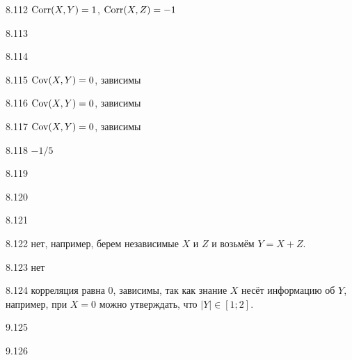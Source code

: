 \begin{solution}{{8.112}}
$\operatorname{Corr}(X,Y)=1$, $\operatorname{Corr}(X,Z)=-1$
\end{solution}
\protect \hypertarget {soln:8.113}{}
\begin{solution}{{8.113}}
\end{solution}
\protect \hypertarget {soln:8.114}{}
\begin{solution}{{8.114}}
\end{solution}
\protect \hypertarget {soln:8.115}{}
\begin{solution}{{8.115}}
      $\operatorname{Cov}(X,Y)=0$, зависимы
\end{solution}
\protect \hypertarget {soln:8.116}{}
\begin{solution}{{8.116}}
    $\operatorname{Cov}(X,Y)=0$, зависимы
\end{solution}
\protect \hypertarget {soln:8.117}{}
\begin{solution}{{8.117}}
  $\operatorname{Cov}(X,Y)=0$, зависимы
\end{solution}
\protect \hypertarget {soln:8.118}{}
\begin{solution}{{8.118}}
  $-1/5$
\end{solution}
\protect \hypertarget {soln:8.119}{}
\begin{solution}{{8.119}}
\end{solution}
\protect \hypertarget {soln:8.120}{}
\begin{solution}{{8.120}}
\end{solution}
\protect \hypertarget {soln:8.121}{}
\begin{solution}{{8.121}}
\end{solution}
\protect \hypertarget {soln:8.122}{}
\begin{solution}{{8.122}}
  нет, например, берем независимые $X$ и $Z$ и возьмём $Y=X+Z$.
\end{solution}
\protect \hypertarget {soln:8.123}{}
\begin{solution}{{8.123}}
нет
\end{solution}
\protect \hypertarget {soln:8.124}{}
\begin{solution}{{8.124}}
  корреляция равна $0$, зависимы, так как знание $X$ несёт информацию об $Y$, например, при $X=0$ можно утверждать, что $|Y| \in [1;2]$.
\end{solution}
\protect \hypertarget {soln:9.125}{}
\begin{solution}{{9.125}}
\end{solution}
\protect \hypertarget {soln:9.126}{}
\begin{solution}{{9.126}}
\end{solution}
